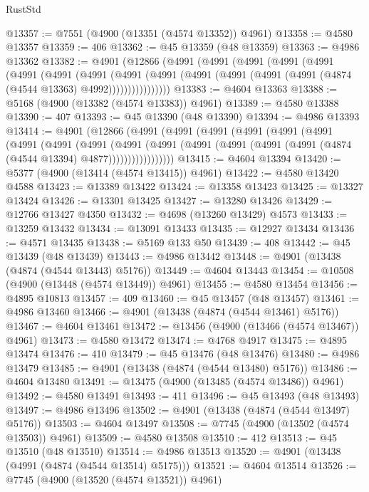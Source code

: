 \begin{lexlean}{RustStd}
\begin{coremodule}
@13357 := @7551 (@4900 (@13351 (@4574 @13352)) @4961)
@13358 := @4580 @13357
@13359 := 406
@13362 := @45 @13359 (@48 @13359)
@13363 := @4986 @13362
@13382 := @4901
    (@12866
      (@4991
        (@4991
          (@4991
            (@4991
              (@4991
                (@4991
                  (@4991
                    (@4991
                      (@4991
                        (@4991
                          (@4991 (@4991 (@4991 (@4991 (@4874 (@4544 @13363) @4992))))))))))))))))
@13383 := @4604 @13363
@13388 := @5168 (@4900 (@13382 (@4574 @13383)) @4961)
@13389 := @4580 @13388
@13390 := 407
@13393 := @45 @13390 (@48 @13390)
@13394 := @4986 @13393
@13414 := @4901
    (@12866
      (@4991
        (@4991
          (@4991
            (@4991
              (@4991
                (@4991
                  (@4991
                    (@4991
                      (@4991
                        (@4991
                          (@4991
                            (@4991 (@4991 (@4991 (@4991 (@4874 (@4544 @13394) @4877)))))))))))))))))
@13415 := @4604 @13394
@13420 := @5377 (@4900 (@13414 (@4574 @13415)) @4961)
@13422 := @4580 @13420 @4588
@13423 := @13389 @13422
@13424 := @13358 @13423
@13425 := @13327 @13424
@13426 := @13301 @13425
@13427 := @13280 @13426
@13429 := @12766 @13427 @4350
@13432 := @4698 (@13260 @13429) @4573
@13433 := @13259 @13432
@13434 := @13091 @13433
@13435 := @12927 @13434
@13436 := @4571 @13435
@13438 := @5169 @133 @50
@13439 := 408
@13442 := @45 @13439 (@48 @13439)
@13443 := @4986 @13442
@13448 := @4901 (@13438 (@4874 (@4544 @13443) @5176))
@13449 := @4604 @13443
@13454 := @10508 (@4900 (@13448 (@4574 @13449)) @4961)
@13455 := @4580 @13454
@13456 := @4895 @10813
@13457 := 409
@13460 := @45 @13457 (@48 @13457)
@13461 := @4986 @13460
@13466 := @4901 (@13438 (@4874 (@4544 @13461) @5176))
@13467 := @4604 @13461
@13472 := @13456 (@4900 (@13466 (@4574 @13467)) @4961)
@13473 := @4580 @13472
@13474 := @4768 @4917
@13475 := @4895 @13474
@13476 := 410
@13479 := @45 @13476 (@48 @13476)
@13480 := @4986 @13479
@13485 := @4901 (@13438 (@4874 (@4544 @13480) @5176))
@13486 := @4604 @13480
@13491 := @13475 (@4900 (@13485 (@4574 @13486)) @4961)
@13492 := @4580 @13491
@13493 := 411
@13496 := @45 @13493 (@48 @13493)
@13497 := @4986 @13496
@13502 := @4901 (@13438 (@4874 (@4544 @13497) @5176))
@13503 := @4604 @13497
@13508 := @7745 (@4900 (@13502 (@4574 @13503)) @4961)
@13509 := @4580 @13508
@13510 := 412
@13513 := @45 @13510 (@48 @13510)
@13514 := @4986 @13513
@13520 := @4901 (@13438 (@4991 (@4874 (@4544 @13514) @5175)))
@13521 := @4604 @13514
@13526 := @7745 (@4900 (@13520 (@4574 @13521)) @4961)

\end{coremodule}
\end{lexlean}
